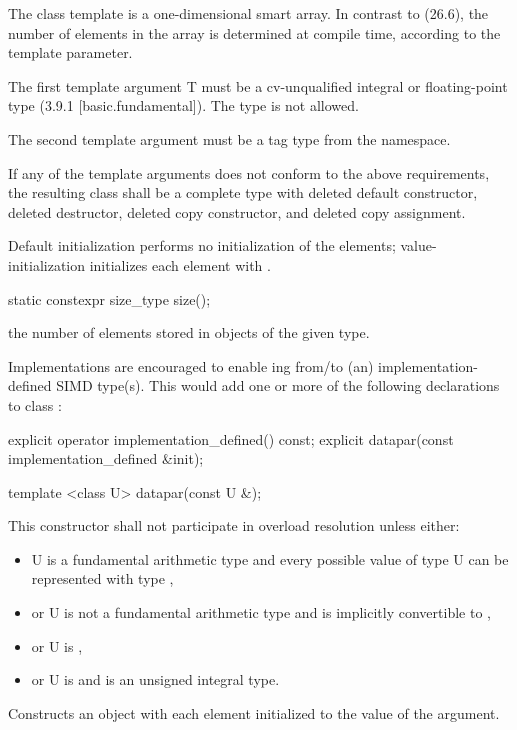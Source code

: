 

\pnum The class template \datapar{} is a one-dimensional smart array.
In contrast to  (26.6), the number of elements in the array is determined at compile time, according to the  template parameter.

\pnum The first template argument \type T must be a cv-unqualified integral or floating-point type (3.9.1 [basic.fundamental]).
The type \bool is not allowed.

\pnum The second template argument  must be a tag type from the  namespace.

\pnum If any of the template arguments does not conform to the above requirements, the resulting class shall be a complete type with deleted default constructor, deleted destructor, deleted copy constructor, and deleted copy assignment.

\pnum Default initialization performs no initialization of the elements; value-initialization initializes each element with .

\begin{itemdecl}
static constexpr size_type size();
\end{itemdecl}
\begin{itemdescr}
  \pnum\returns the number of elements stored in objects of the given \datapar[<T, Abi>] type.
\end{itemdescr}

\pnum\realnote Implementations are encouraged to enable ing from/to (an) implementation-defined SIMD type(s).
This would add one or more of the following declarations to class \datapar:
\begin{itemdecl}
explicit operator implementation_defined() const;
explicit datapar(const implementation_defined &init);
\end{itemdecl}

\begin{itemdecl}
template <class U> datapar(const U &);
\end{itemdecl}
\begin{itemdescr}
  \pnum\remarks This constructor shall not participate in overload resolution unless either:
  \begin{itemize}
    \item \type U is a fundamental arithmetic type and every possible value of type \type U can be represented with type ,
    \item or \type U is not a fundamental arithmetic type and is implicitly convertible to ,
    \item or \type U is \intt,
    \item or \type U is \uint and  is an unsigned integral type.
  \end{itemize}
  \pnum\effects Constructs an object with each element initialized to the value of the argument.
\end{itemdescr}

